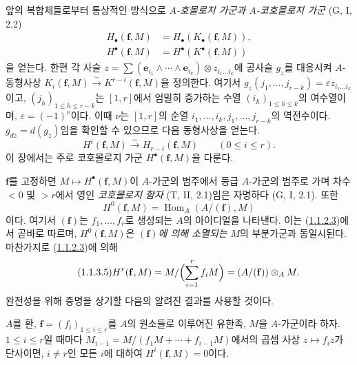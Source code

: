 \begin{env}[1.1.3]
\label{III.1.1.3-fr}
앞의 복합체들로부터 통상적인 방식으로 \emph{$A$-호몰로지 가군과
$A$-코호몰로지 가군} (G, I, 2.2)
\begin{align}
\label{III.1.1.3.1-fr}
\tag{1.1.3.1}
H_\bullet(\mathbf f,M)&=H_\bullet(K_\bullet(\mathbf f,M)),\\
\label{III.1.1.3.2-fr}
\tag{1.1.3.2}
H^\bullet(\mathbf f,M)&=H^\bullet(K^\bullet(\mathbf f,M))
\end{align}
을 얻는다. 한편 각 사슬
$z=\sum(\mathbf e_{i_1}\wedge\cdots\wedge\mathbf e_{i_k})\otimes
z_{i_1\ldots i_k}$에 공사슬 $g_z$를 대응시켜 $A$-동형사상
$K_i(\mathbf f,M)\xrightarrow{\sim}K^{r-i}(\mathbf f,M)$을 정의한다. 여기서
$g_z(j_1,\ldots,j_{r-k})=\varepsilon z_{i_1\ldots i_k}$이고,
$(j_h)_{1\leq h\leq r-k}$는 $[1,r]$에서 엄밀히 증가하는 수열
$(i_h)_{1\leq h\leq k}$의 여수열이며,
$\varepsilon=(-1)^\nu$이다. 이때 $\nu$는 $[1,r]$의 순열
$i_1,\ldots,i_k,j_1,\ldots,j_{r-k}$의 역전수이다. $g_{dz}=d(g_z)$임을
확인할 수 있으므로 다음 동형사상을 얻는다.
\begin{equation}
\label{III.1.1.3.3-fr}
\tag{1.1.3.3}
H^i(\mathbf f,M)\xrightarrow{\sim}H_{r-i}(\mathbf f,M)
\qquad(0\leq i\leq r).
\end{equation}
이 장에서는 주로 코호몰로지 가군 $H^\bullet(\mathbf f,M)$을 다룬다.

$\mathbf f$를 고정하면 $M\mapsto H^\bullet(\mathbf f,M)$이 $A$-가군의
범주에서 등급 $A$-가군의 범주로 가며 차수 $<0$ 및 $>r$에서 영인
\emph{코호몰로지 함자} (T, II, 2.1)임은 자명하다 (G, I, 2.1).
또한
\begin{equation}
\label{III.1.1.3.4-fr}
\tag{1.1.3.4}
H^0(\mathbf f,M)=\operatorname{Hom}_A(A/(\mathbf f),M)
\end{equation}
이다. 여기서 $(\mathbf f)$는 $f_1,\ldots,f_r$로 생성되는 $A$의
아이디얼을 나타낸다. 이는 (\hyperref[III.1.1.2.3-fr]{1.1.2.3})에서
곧바로 따르며, $H^0(\mathbf f,M)$은 \emph{$(\mathbf f)$에 의해 소멸되는}
$M$의 부분가군과 동일시된다. 마찬가지로
(\hyperref[III.1.1.2.3-fr]{1.1.2.3})에 의해
\begin{equation}
\label{III.1.1.3.5-fr}
\tag{1.1.3.5}
H^r(\mathbf f,M)=M/\Bigl(\sum_{i=1}^r f_iM\Bigr)
=(A/(\mathbf f))\otimes_A M.
\end{equation}
완전성을 위해 증명을 상기할 다음의 알려진 결과를 사용할 것이다.
\end{env}

\begin{proposition}[1.1.4]
\label{III.1.1.4-fr}
$A$를 환, $\mathbf f=(f_i)_{1\leq i\leq r}$를 $A$의 원소들로 이루어진
유한족, $M$을 $A$-가군이라 하자. $1\leq i\leq r$일 때마다
$M_{i-1}=M/(f_1M+\cdots+f_{i-1}M)$에서의 곱셈 사상
$z\mapsto f_i z$가 단사이면, $i\neq r$인 모든 $i$에 대하여
$H^i(\mathbf f,M)=0$이다.
\end{proposition}

